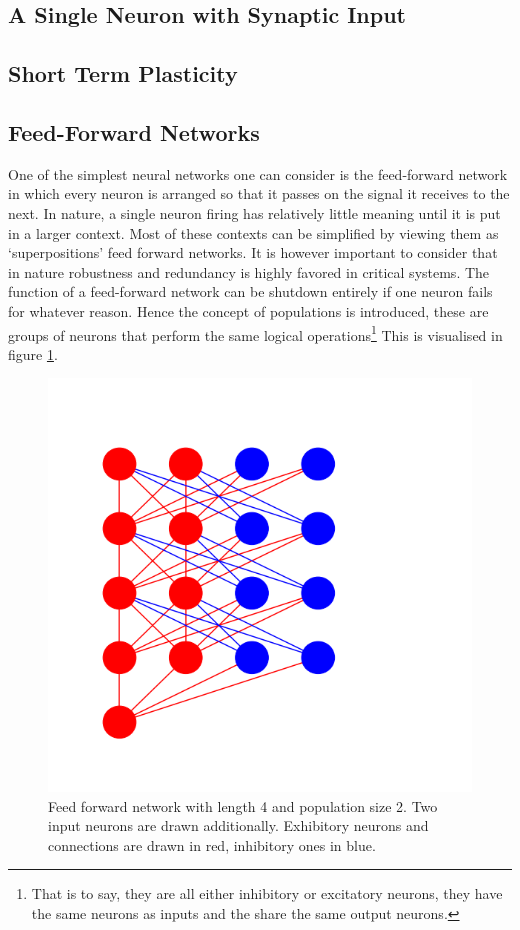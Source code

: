 \documentclass[a4paper,twocolumn]{article}
\begin{document}
\subsection{A Single Neuron with Synaptic Input}
\subsection{Short Term Plasticity}

\subsection{Feed-Forward Networks}

One of the simplest neural networks one can consider is the feed-forward
network in which every neuron is arranged so that it passes on the signal it
receives to the next. In nature, a single neuron firing has relatively little
meaning until it is put in a larger context. Most of these contexts can be
simplified by viewing them as `superpositions' feed forward networks. It is
however important to consider that in nature robustness and redundancy is
highly favored in critical systems. The function of a feed-forward network can
be shutdown entirely if one neuron fails for whatever reason. Hence the concept
of populations is introduced, these are groups of neurons that perform the same
logical operations\footnote{That is to say, they are all either inhibitory or
excitatory neurons, they have the same neurons as inputs and the share the same
output neurons.} This is visualised in figure \ref{fig:feed-forward}.

\begin{figure}[ht]
    \centering
    \includegraphics[width=.5\textwidth]{figures/feedforward network.png}
    \caption{Feed forward network with length 4 and population size 2. Two input
        neurons are drawn additionally. Exhibitory neurons and connections are drawn
        in red, inhibitory ones in blue.}
    \label{fig:feed-forward}
\end{figure}
\end{document}
